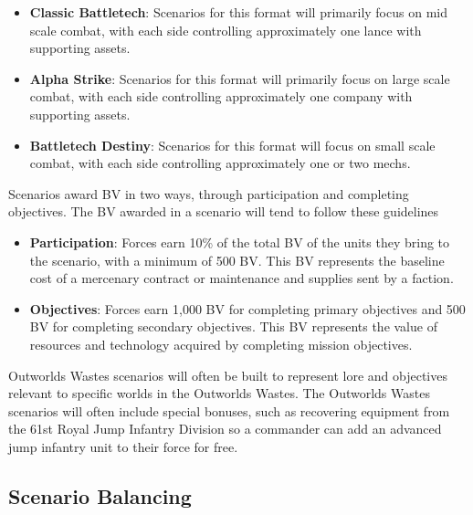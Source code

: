 \documentclass[UTF8]{article}
\begin{document}
\begin{itemize}

\item {\bf Classic Battletech}: Scenarios for this format will primarily focus on mid scale combat, with each side controlling approximately one lance with supporting assets.

\item {\bf Alpha Strike}: Scenarios for this format will primarily focus on large scale combat, with each side controlling approximately one company with supporting assets.

\item {\bf Battletech Destiny}: Scenarios for this format will focus on small scale combat, with each side controlling approximately one or two mechs.

\end{itemize}

Scenarios award BV in two ways, through participation and completing objectives.
The BV awarded in a scenario will tend to follow these guidelines

\begin{itemize}

\item {\bf Participation}: Forces earn 10\% of the total BV of the units they bring to the scenario, with a minimum of 500 BV.
This BV represents the baseline cost of a mercenary contract or maintenance and supplies sent by a faction.

\item {\bf Objectives}: Forces earn 1,000 BV for completing primary objectives and 500 BV for completing secondary objectives.
This BV represents the value of resources and technology acquired by completing mission objectives.

\end{itemize}

Outworlds Wastes scenarios will often be built to represent lore and objectives relevant to specific worlds in the Outworlds Wastes.
The Outworlds Wastes scenarios will often include special bonuses, such as recovering equipment from the 61st Royal Jump Infantry Division so a commander can add an advanced jump infantry unit to their force for free.\\

\subsection{Scenario Balancing}
\end{document}
